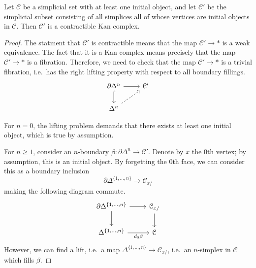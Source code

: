 \documentclass[main.tex]{subfiles}
\begin{document}
\begin{theorem}
  Let $\mathcal{C}$ be a simplicial set with at least one initial object, and let $\mathcal{C}'$ be the simplicial subset consisting of all simplices all of whose vertices are initial objects in $\mathcal{C}$. Then $\mathcal{C}'$ is a contractible Kan complex.
\end{theorem}
\begin{proof}
  The statment that $\mathcal{C}'$ is contractible means that the map $\mathcal{C}' \to *$ is a weak equivalence. The fact that it is a Kan complex means precisely that the map $\mathcal{C}' \to *$ is a fibration. Therefore, we need to check that the map $\mathcal{C}' \to *$ is a trivial fibration, i.e.\ has the right lifting property with respect to all boundary fillings.
  \begin{equation*}
    \begin{tikzcd}
      \partial \Delta^{n}
      \arrow[r]
      \arrow[d, hookrightarrow]
      & \mathcal{C'}
      \\
      \Delta^{n}
      \arrow[ur, dashed]
    \end{tikzcd}
  \end{equation*}

  For $n = 0$, the lifting problem demands that there exists at least one initial object, which is true by assumption.

  For $n \geq 1$, consider an $n$-boundary $\beta\colon \partial \Delta^{n} \to \mathcal{C}'$. Denote by $x$ the 0th vertex; by assumption, this is an initial object. By forgetting the $0$th face, we can consider this as a boundary inclusion
  \begin{equation*}
    \partial \Delta^{\{1, \ldots, n\}} \to \mathcal{C}_{x/}
  \end{equation*}
  making the following diagram commute.
  \begin{equation*}
    \begin{tikzcd}
      \partial \Delta^{\{1, \ldots, n\}}
      \arrow[r]
      \arrow[d]
      & \mathcal{C}_{x/}
      \arrow[d]
      \\
      \Delta^{\{1, \ldots, n\}}
      \arrow[r, swap, "d_{0}\beta"]
      & \mathcal{C}
    \end{tikzcd}
  \end{equation*}
  However, we can find a lift, i.e.\ a map $\Delta^{\{1, \ldots, n\}} \to \mathcal{C}_{x/}$, i.e.\ an $n$-simplex in $\mathcal{C}$ which fills $\beta$.
\end{proof}
\end{document}
